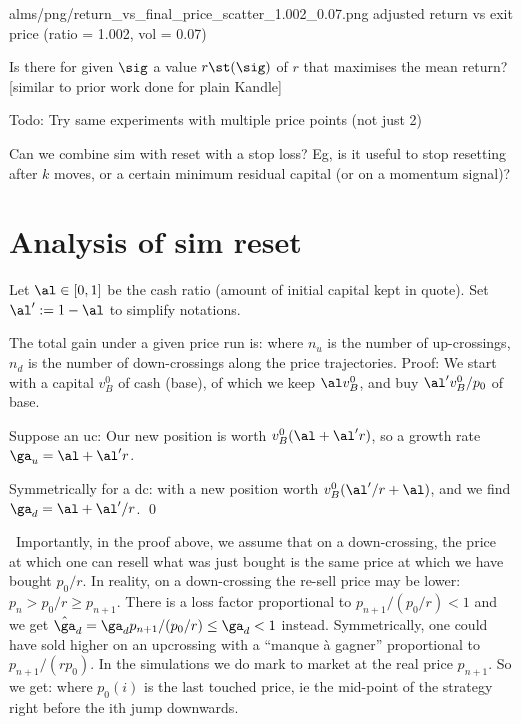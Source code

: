 \documentclass[oneside,12pt]{article}
\begin{document}
\IG{200pt}
{alms/png/return_vs_final_price_scatter_1.002_0.07.png}
{adjusted return vs exit price (ratio = 1.002, vol = 0.07)}

\QS[1] Is there for given $\sig$ a value $r\st(\sig)$ of $r$ that maximises the mean return? [similar to prior work done
for plain Kandle]

Todo: Try same experiments with multiple price points (not just 2)

Can we combine sim with reset with a stop loss? Eg, is it useful to stop resetting after $k$ moves,
or a certain minimum residual capital (or on a momentum signal)?



\section{Analysis of sim reset}

Let $\al\in[0,1]$ be the cash ratio (amount of initial capital kept in quote).
Set $\al':=1-\al$ to simplify notations.

\PRO 
The total gain under a given price run is:
where $n_u$ is the number of up-crossings, $n_d$
is the number of down-crossings along the price trajectories.
\ORP
Proof:
We start with a capital $v^0_B$ of cash (base),
of which we keep $\al v^0_B$, 
and buy $\al'v^0_B/p_0$ of base. 

Suppose an uc:
Our new position is worth $v^0_B(\al+ \al'r)$,
so a growth rate $\ga_u=\al+ \al'r$.

Symmetrically for a dc:
with a new position worth $v^0_B(\al'/r+\al )$, and we find $\ga_d=\al+ \al'/r$.
\qed

\NB\ Importantly, in the proof above, 
we assume that on a down-crossing,
the price at which one can resell what was just bought 
is the same price at which we have bought $p_0/r$. 
In reality, on a down-crossing the re-sell price may be lower:
$p_n>p_0/r\geq p_{n+1}$. 
There is a loss factor proportional to $p_{n+1}/(p_0/r)<1$ and we get 
$\hat\ga_d=\ga_dp_{n+1}/(p_0/r)\leq \ga_d<1$ instead.
Symmetrically,
one could have sold higher on an upcrossing with a ``manque à gagner'' proportional 
to $p_{n+1}/(rp_0)$. In the simulations we do mark to market at the real price $p_{n+1}$.
So we get:
where $p_0(i)$ is the last touched price, ie the mid-point of the strategy right before the
ith jump downwards.
\end{document}
